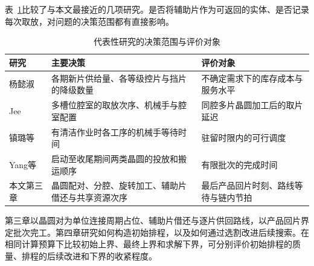 表~\ref{tab:review-decisions}比较了与本文最接近的几项研究。是否将辅助片作为可返回的实体、是否记录每次取放，对问题的决策范围都有直接影响。

\begin{table}[htbp]
\centering
\caption{代表性研究的决策范围与评价对象}\label{tab:review-decisions}
\small
\begin{tabularx}{\textwidth}{@{}p{}XX@{}}
\toprule
研究 & 主要决策 & 评价对象 \\
\midrule
杨懿淑\citep{yang2009dummyphd} & 各期新片供给量、各等级控片与挡片的降级数量 & 不确定需求下的库存成本与服务水平 \\
Jee\citep{jee2021thesis} & 多槽位腔室的取放次序、机械手与腔室配置 & 同腔多片晶圆加工后的取片延迟 \\
镇璐等\citep{zhen2023cnclean} & 有清洁作业时各工序的机械手等待时间 & 驻留时限内的可行调度 \\
Yang等\citep{yang2025noncyclic} & 启动至收尾期间两类晶圆的投放和搬运顺序 & 有限批次的完成时间 \\
本文第三章 & 晶圆配对、分腔、旋转加工、辅助片借还与共享资源次序 & 最后产品回片时刻、路线等待与链内节拍 \\
\bottomrule
\end{tabularx}
\end{table}

第三章以晶圆对为单位连接周期占位、辅助片借还与逐片供回路线，以产品回片界定批次完工。第四章研究如何构造初始排程，以及如何通过选割改进后续搜索。在相同计算预算下比较初始上界、最终上界和求解下界，可分别评价初始排程的质量、排程的后续改进和下界的收紧程度。
